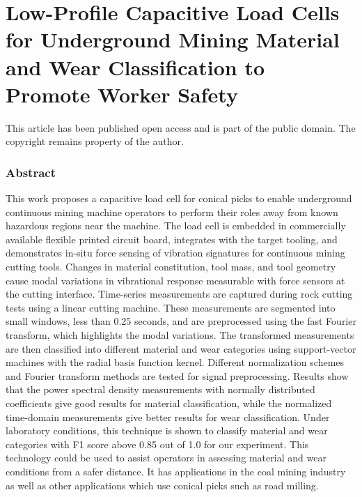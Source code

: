 \chapter[
Capacitive Load Cells to 
 Promote Worker Safety
]{
Low-Profile Capacitive Load Cells for 
 Underground Mining Material and Wear Classification
 to Promote Worker Safety
\label{chap:P1}
}

\newcommand{\ora}{\overrightarrow}

\begin{center}
This article has been published open access and is part of the public domain.
The copyright remains property of the author.
\end{center}

\subsection{Abstract}

This work proposes a capacitive load cell for conical picks to enable 
 underground continuous mining machine operators to 
 perform their roles away from known hazardous regions near the machine.
The load cell is embedded in commercially available flexible printed circuit board,
 integrates with the target tooling, and demonstrates in-situ force sensing 
 of vibration signatures for continuous mining cutting tools.
Changes in material constitution, tool mass, and tool geometry cause modal variations
 in vibrational response measurable with force sensors at the cutting interface.
Time-series measurements are captured during rock cutting tests using a linear cutting machine.
These measurements are segmented into small windows, less than 0.25 seconds, and are preprocessed 
 using the fast Fourier transform, which highlights the modal variations.
The transformed measurements are then classified into different material and wear categories
 using support-vector machines with the radial basis function kernel.
Different normalization schemes and Fourier transform methods are tested for signal preprocessing.
Results show that the power spectral density measurements with normally distributed coefficients 
 give good results for material classification, while the normalized time-domain measurements
 give better results for wear classification.
Under laboratory conditions, this technique is shown to 
 classify material and wear categories with F1 score above 0.85 out of 1.0 for our experiment.
This technology could be used to assist operators in assessing material and wear conditions from
 a safer distance. 
It has applications in the coal mining industry as well as other applications
which use conical picks such as road milling.

